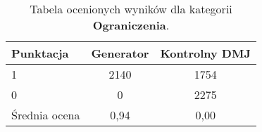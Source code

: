 \begin{table}[ht]
\caption{Tabela ocenionych wyników dla kategorii \textbf{Ograniczenia}.}\label{tab:tabela14}
\centering%
\begin{tabular}{|l|c|c|}
\hline
\textbf{Punktacja} & \textbf{Generator} & \textbf{Kontrolny DMJ}\\
\hline
1 & 2140 & 1754 \\
\hline
0 & 0 & 2275 \\
\hline
Średnia ocena & 0,94 & 0,00 \\
\hline
\end{tabular}
\end{table}



